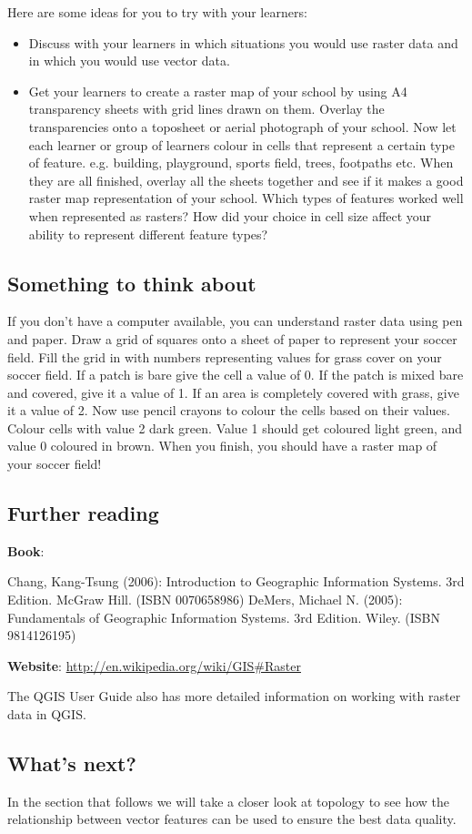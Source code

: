 Here are some ideas for you to try with your learners:

\begin{itemize}
\item Discuss with your learners in which situations you would use raster
data and in which you would use vector data.
\item Get your learners to create a raster map of your school by using  A4
transparency sheets with grid lines drawn on them. Overlay the transparencies
onto a toposheet or aerial photograph of your school. Now let each learner or
group of learners colour in cells that represent a certain type of feature.
e.g. building, playground, sports field, trees, footpaths etc. When they are
all finished, overlay all the sheets together and see if it makes a good
raster map representation of your school. Which types of features worked well
when represented as rasters? How did your choice in cell size affect your
ability to represent different feature types?
\end{itemize}

\subsection{Something to think about}

If you don't have a computer available, you can understand raster data using
pen and paper. Draw a grid of squares onto a sheet of paper to represent your
soccer field. Fill the grid in with numbers representing values for grass
cover on your soccer field. If a patch is bare give the cell a value of 0. If
the patch is mixed bare and covered, give it a value of 1. If an area is
completely covered with grass, give it a value of 2. Now use pencil crayons
to colour the  cells based on their values. Colour cells with value 2 dark
green. Value 1 should get coloured light green, and value 0 coloured in
brown. When you finish, you should have a raster map of your soccer field!


\subsection{Further reading}

\textbf{Book}:
 
Chang, Kang-Tsung (2006): Introduction to Geographic Information Systems. 3rd
Edition.  McGraw Hill. (ISBN 0070658986)
DeMers, Michael N. (2005): Fundamentals of Geographic Information Systems.
3rd Edition. Wiley. (ISBN 9814126195)

\textbf{Website}: \url{http://en.wikipedia.org/wiki/GIS#Raster}


The QGIS User Guide also has more detailed information on working with raster
data in QGIS.

\subsection{What's next?}

In the section that follows we will take a closer look at topology to see how
the relationship between vector features can be used to ensure the best data
quality.


